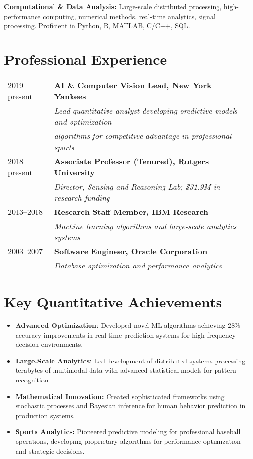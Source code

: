 \documentclass[11pt]{article}
\begin{document}
\textbf{Computational \& Data Analysis:} Large-scale distributed processing, high-performance computing, numerical methods, real-time analytics, signal processing. Proficient in Python, R, MATLAB, C/C++, SQL.

\section{Professional Experience}
\begin{tabular}{l l}
2019--present & \textbf{AI \& Computer Vision Lead, New York Yankees} \\
& \textit{Lead quantitative analyst developing predictive models and optimization} \\
& \textit{algorithms for competitive advantage in professional sports} \\
2018--present & \textbf{Associate Professor (Tenured), Rutgers University} \\
& \textit{Director, Sensing and Reasoning Lab; \$31.9M in research funding} \\
2013--2018 & \textbf{Research Staff Member, IBM Research} \\
& \textit{Machine learning algorithms and large-scale analytics systems} \\
2003--2007 & \textbf{Software Engineer, Oracle Corporation} \\
& \textit{Database optimization and performance analytics} \\
\end{tabular}

\section{Key Quantitative Achievements}
\begin{itemize}
    \item \textbf{Advanced Optimization:} Developed novel ML algorithms achieving 28\% accuracy improvements in real-time prediction systems for high-frequency decision environments.
    \item \textbf{Large-Scale Analytics:} Led development of distributed systems processing terabytes of multimodal data with advanced statistical models for pattern recognition.
    \item \textbf{Mathematical Innovation:} Created sophisticated frameworks using stochastic processes and Bayesian inference for human behavior prediction in production systems.
    \item \textbf{Sports Analytics:} Pioneered predictive modeling for professional baseball operations, developing proprietary algorithms for performance optimization and strategic decisions.
\end{itemize}
\end{document}
